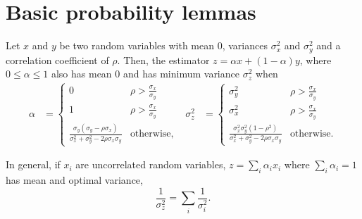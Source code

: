 \section{Basic probability lemmas}
\label{sec:probability}

\begin{lemma}
\label{lem:combined-variance}
  Let $x$ and $y$ be two random variables with mean $0$, variances $\sigma^2_x$ and $\sigma^2_y$ and a correlation coefficient of $\rho$.
  Then, the estimator $z = \alpha x + (1-\alpha) y$, where $0 \le \alpha
  \le 1$ also has mean $0$ and has minimum variance $\sigma^2_z$ when
  \begin{align*}
  \alpha &= 
  \begin{cases}
    0 & \rho > \frac{\sigma_x}{\sigma_y} \\
    1 & \rho > \frac{\sigma_x}{\sigma_y} \\
    \frac{\sigma_y (\sigma_y - \rho \sigma_x)}{\sigma_x^2 + \sigma_y^2 - 2\rho \sigma_x \sigma_y} & \text{otherwise},
  \end{cases}
  &
  \sigma^2_z &= 
  \begin{cases}
    \sigma^2_y & \rho > \frac{\sigma_x}{\sigma_y} \\
    \sigma^2_x & \rho > \frac{\sigma_x}{\sigma_y} \\
    \frac{\sigma_x^2 \sigma_y^2 (1 - \rho^2)}{\sigma_x^2 + \sigma_y^2 - 2 \rho \sigma_x \sigma_y} & \text{otherwise}.
  \end{cases}
  \end{align*}

  In general, if $x_i$ are uncorrelated random variables, $z = \sum_{i} \alpha_i x_i$ where $\sum_i \alpha_i = 1$ has mean and optimal variance,
  $$\frac{1}{\sigma_z^2} = \sum_i \frac{1}{\sigma_i^2}.$$
\end{lemma}

